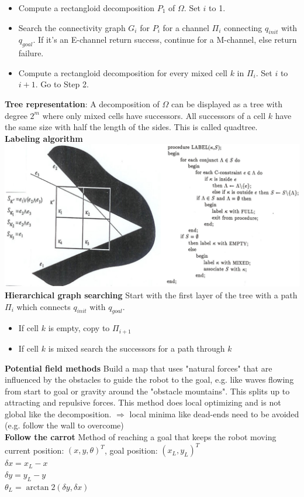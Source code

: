 \documentclass[12pt]{article}
\begin{document}
	\begin{itemize}
		\item Compute a rectangloid decomposition $P_1$ of $\Omega$. Set $i$ to 1.
		\item Search the connectivity graph $G_i$ for $P_i$ for a channel $\Pi_i$ connecting $q_{init}$ with $q_{goal}$. If it's an E-channel return success, continue for a M-channel, else return failure.
		\item Compute a rectangloid decomposition for every mixed cell $k$ in $\Pi_i$. Set $i$ to $i+1$. Go to Step 2.
	\end{itemize}
	\textbf{Tree representation}: A decomposition of $\Omega$ can be displayed as a tree with degree $2^m$ where only mixed cells have successors. All successors of a cell $k$ have the same size with half the length of the sides. This is called quadtree.\\
	\textbf{Labeling algorithm}\\
	\includegraphics[width=\linewidth]{figures/labeling-algorithm.png}\\
	\textbf{Hierarchical graph searching} Start with the first layer of the tree with a path $\Pi_i$ which connects $q_{init}$ with $q_{goal}$.
	\begin{itemize}
		\item If cell $k$ is empty, copy to $\Pi_{i+1}$
		\item If cell $k$ is mixed search the successors for a path through $k$
	\end{itemize}
	\textbf{Potential field methods} Build a map that uses "natural forces" that are influenced by the obstacles to guide the robot to the goal, e.g. like waves flowing from start to goal or gravity around the "obstacle mountains". This splits up to attracting and repulsive forces. This method does local optimizing and is not global like the decomposition. $\Rightarrow$ local minima like dead-ends need to be avoided (e.g. follow the wall to overcome)\\
	\textbf{Follow the carrot} Method of reaching a goal that keeps the robot moving\\
	current position: $(x, y, \theta)^T$, goal position: $(x_L, y_L)^T$\\
	$\delta x = x_L - x$\\
	$\delta y = y_L - y$\\
	$\theta_L = \arctan2(\delta y, \delta x)$
\end{document}
